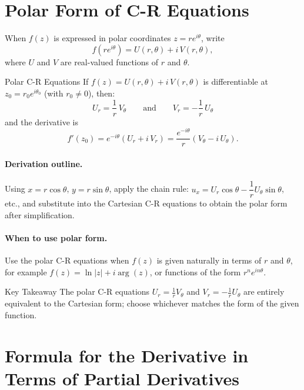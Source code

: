 \documentclass[12pt,a4paper]{article}
\begin{document}
\section{Polar Form of C-R Equations}

When $f(z)$ is expressed in polar coordinates $z = re^{i\theta}$, write
\[
  f(re^{i\theta}) = U(r,\theta) + i\,V(r,\theta),
\]
where $U$ and $V$ are real-valued functions of $r$ and $\theta$.

\begin{infobox}{Polar C-R Equations}
If $f(z) = U(r,\theta) + i\,V(r,\theta)$ is differentiable at $z_0 = r_0 e^{i\theta_0}$ (with $r_0 \neq 0$), then:
\[
  \boxed{U_r = \frac{1}{r}\,V_\theta} \qquad \text{and} \qquad \boxed{V_r = -\frac{1}{r}\,U_\theta}
\]
and the derivative is
\[
  f'(z_0) = e^{-i\theta}\left(U_r + i\,V_r\right) = \frac{e^{-i\theta}}{r}\left(V_\theta - i\,U_\theta\right).
\]
\end{infobox}

\paragraph{Derivation outline.}
Using $x = r\cos\theta$, $y = r\sin\theta$, apply the chain rule:
$u_x = U_r \cos\theta - \dfrac{1}{r}U_\theta \sin\theta$,
etc., and substitute into the Cartesian C-R equations to obtain the polar form after simplification.

\paragraph{When to use polar form.}
Use the polar C-R equations when $f(z)$ is given naturally in terms of $r$ and $\theta$, for example $f(z) = \ln|z| + i\arg(z)$, or functions of the form $r^n e^{in\theta}$.

\begin{learnbox}{Key Takeaway}
The polar C-R equations $U_r = \tfrac{1}{r}V_\theta$ and $V_r = -\tfrac{1}{r}U_\theta$ are entirely equivalent to the Cartesian form; choose whichever matches the form of the given function.
\end{learnbox}

\section{Formula for the Derivative in Terms of Partial Derivatives}
\end{document}
